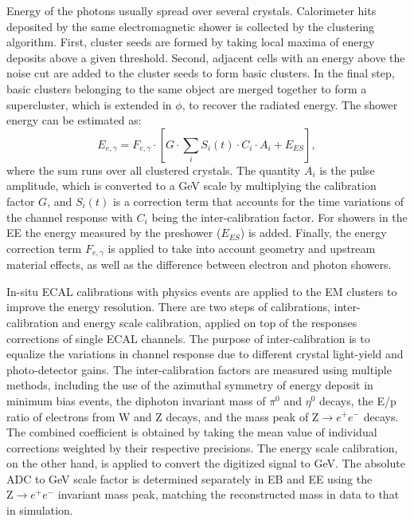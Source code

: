 \documentclass[thesis.tex]{subfiles}
\begin{document}
Energy of the photons usually spread over several crystals. 
Calorimeter hits deposited by the same electromagnetic shower is collected by the clustering algorithm. 
First, cluster seeds are formed by taking local maxima of energy deposits above a given threshold. 
Second, adjacent cells with an energy above the noise cut are added to the cluster seeds to form basic clusters. 
In the final step, basic clusters belonging to the same object are merged together to form a supercluster, which is extended in $\phi$, to recover the radiated energy. 
The shower energy can be estimated as:
\begin{equation}
      E_{e, \gamma} = F_{e, \gamma} \cdot [ G \cdot  \displaystyle\sum_{i} S_i(t) \cdot C_i \cdot A_i + E_{ES}],
\end{equation}
where the sum runs over all clustered crystals. The quantity $A_i$ is the pulse
amplitude, which is converted to a GeV scale by multiplying the calibration
factor $G$, and $S_i(t)$ is a correction term that accounts for the time
variations of the channel response with $C_i$ being the inter-calibration
factor. For showers in the EE the energy measured by the preshower
($E_{ES}$) is added. Finally, the energy correction term $F_{e, \gamma}$
is applied to take into account geometry and upstream material
effects, as well as the difference between electron and photon showers. 

In-situ ECAL calibrations with physics events are applied to the EM clusters to improve the energy resolution. 
There are two steps of calibrations, inter-calibration and energy scale calibration, applied on top of the responses corrections of single ECAL channels. 
The purpose of inter-calibration is to equalize the variations in channel response due to different crystal light-yield and photo-detector gains. 
The inter-calibration factors are measured using multiple methods, including the use of the azimuthal symmetry of energy deposit in minimum bias events, the diphoton invariant mass of $\pi^0$ and $\eta^0$ decays, the E/p ratio of electrons from W and Z decays, and the mass peak of $\mathrm{Z}\rightarrow e^+e^-$ decays. 
The combined coefficient is obtained by taking the mean value of individual corrections weighted by their respective precisions. 
The energy scale calibration, on the other hand, is applied to convert the digitized signal to GeV. 
The absolute ADC to GeV scale factor is determined separately in EB and EE using the $\mathrm{Z}\rightarrow e^+e^-$ invariant mass peak, matching the reconstructed mass in data to that in simulation. 
\end{document}
